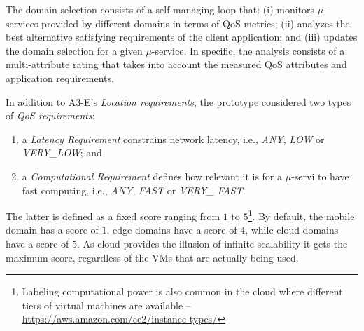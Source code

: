 The domain selection consists of a self-managing loop that: (i) monitors $\mu$-services provided by different domains in terms of QoS metrics; (ii) analyzes the best alternative satisfying requirements of the client application; and (iii) updates the domain selection for a given $\mu$-service. In specific, the analysis consists of a multi-attribute rating that takes into account the measured QoS attributes and application requirements.

In addition to A3-E's \textit{Location requirements}, the prototype considered two types of \textit{QoS requirements}:

{\small
\begin{enumerate}
	
	
	\item a \textit{Latency Requirement} constrains network latency, i.e., \textit{ANY}, \textit{LOW} or \textit{VERY\_LOW}; and 
	
	\item a \textit{Computational Requirement} defines how relevant it is for a $\mu$-servi to have fast computing, i.e., \textit{ANY}, \textit{FAST} or \textit{VERY\_ FAST}. 
\end{enumerate}
}%

The latter is defined as a fixed score ranging from $1$ to $5$\footnote{Labeling computational power is also common in the cloud where different tiers of virtual machines are available -- \url{https://aws.amazon.com/ec2/instance-types/}}. By default, the mobile domain has a score of $1$, edge domains have a score of $4$, while cloud domains have a score of $5$. As cloud provides the illusion of infinite scalability it gets the maximum score, regardless of the VMs that are actually being used. 

